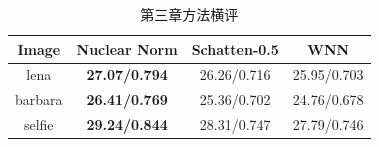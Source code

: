\begin{table}[htbp]
\centering
\caption{第三章方法横评}
\label{tab:chapter3_compare}
\small
\begin{tabular}{|c|c|c|c|}
\hline
Image & Nuclear Norm & Schatten-0.5 & WNN \\
\hline
lena & \textbf{27.07/0.794} & 26.26/0.716 & 25.95/0.703 \\
barbara & \textbf{26.41/0.769} & 25.36/0.702 & 24.76/0.678 \\
selfie & \textbf{29.24/0.844} & 28.31/0.747 & 27.79/0.746 \\
\hline
\end{tabular}
\end{table}
